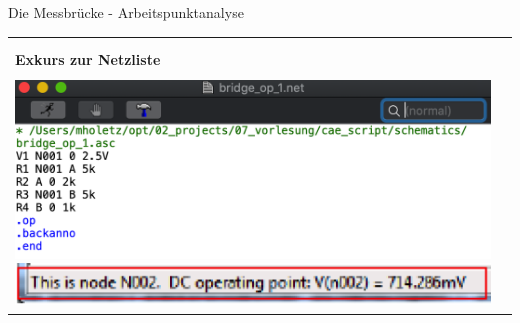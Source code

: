 \begin{frame}[t]{Die Messbrücke - Arbeitspunktanalyse}
\begin{spacing}{0.9}
\begin{tiny}
\begin{table}[h!]
\begin{tabular}{p{3cm} p{7cm}}
\begin{minipage}{.7\textwidth}
\begin{itemize}
       \end{itemize}
       \end{minipage} 
       \\
       &\\
       \hline
       \textbf{Exkurs zur Netzliste} & \\
       \hline \\
       \begin{minipage}{.3\textwidth}
        \includegraphics[width=\linewidth]{pictures/netlist.png}\newline
        \includegraphics[width=\linewidth]{pictures/knotenname.png}
      \end{minipage} 
      & 
      \begin{minipage}{.7\textwidth}
      

\end{minipage}
\end{tabular}
\end{table}
\end{tiny}
\end{spacing}
\end{frame}
